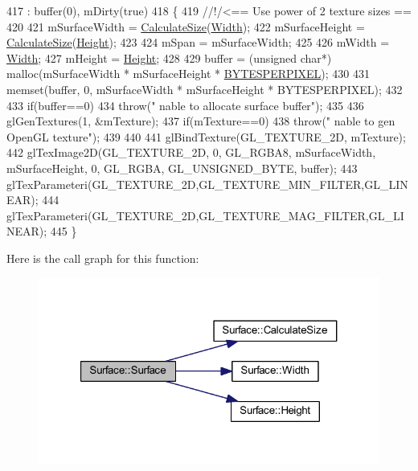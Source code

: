 \begin{DoxyCode}
417                                       : buffer(0), mDirty(\textcolor{keyword}{true})
418 \{\textcolor{comment}{}
419 \textcolor{comment}{    //!/<== Use power of 2 texture sizes ==}
420 \textcolor{comment}{}
421     mSurfaceWidth = \hyperlink{class_surface_aeb8a8540f415a4d29c440667e8532e91}{CalculateSize}(\hyperlink{class_surface_ae76d7c2fa208df6979a77cc60e8105c0}{Width});
422     mSurfaceHeight = \hyperlink{class_surface_aeb8a8540f415a4d29c440667e8532e91}{CalculateSize}(\hyperlink{class_surface_ab901f48d51b3fd427415b580dc15518c}{Height});
423 
424     mSpan = mSurfaceWidth;
425 
426     mWidth = \hyperlink{class_surface_ae76d7c2fa208df6979a77cc60e8105c0}{Width};
427     mHeight = \hyperlink{class_surface_ab901f48d51b3fd427415b580dc15518c}{Height};
428 
429     buffer = (\textcolor{keywordtype}{unsigned} \textcolor{keywordtype}{char}*) malloc(mSurfaceWidth * mSurfaceHeight * 
      \hyperlink{supportcode_8h_afb291d1c2072afc3383bc2e688e75d3b}{BYTESPERPIXEL});
430 
431     memset(buffer, 0, mSurfaceWidth * mSurfaceHeight * BYTESPERPIXEL);
432 
433     \textcolor{keywordflow}{if}(buffer==0)
434         \textcolor{keywordflow}{throw}(\textcolor{stringliteral}{" nable to allocate surface buffer"});
435 
436     glGenTextures(1, &mTexture);
437     \textcolor{keywordflow}{if}(mTexture==0)
438         \textcolor{keywordflow}{throw}(\textcolor{stringliteral}{" nable to gen OpenGL texture"});
439 
440 
441     glBindTexture(GL\_TEXTURE\_2D, mTexture);
442     glTexImage2D(GL\_TEXTURE\_2D, 0, GL\_RGBA8, mSurfaceWidth, mSurfaceHeight, 0, GL\_RGBA, GL\_UNSIGNED\_BYTE, 
      buffer);
443     glTexParameteri(GL\_TEXTURE\_2D,GL\_TEXTURE\_MIN\_FILTER,GL\_LINEAR);
444     glTexParameteri(GL\_TEXTURE\_2D,GL\_TEXTURE\_MAG\_FILTER,GL\_LINEAR);
445 \}
\end{DoxyCode}
Here is the call graph for this function\+:
\nopagebreak
\begin{figure}[H]
\begin{center}
\leavevmode
\includegraphics[width=321pt]{class_surface_a323ba9165c8635e84eb0c490fe88d846_cgraph}
\end{center}
\end{figure}
\mbox{\label{class_surface_a89de75c95cb550d432f3ea4ed1429db0}} 
